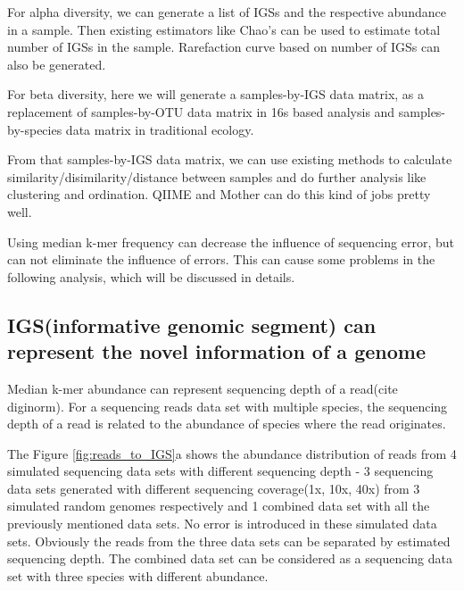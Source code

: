 \documentclass{article}
\begin{document}
For alpha diversity, we can generate a list of IGSs and the respective abundance in a sample. Then existing estimators like Chao's can be used to estimate total number of IGSs in the sample. Rarefaction curve based on number of IGSs can also be generated. 

For beta diversity, here we will generate a samples-by-IGS data matrix, as a replacement of samples-by-OTU data matrix in 16s based analysis and samples-by-species data matrix in traditional ecology. 


From that samples-by-IGS data matrix, we can use existing methods to calculate similarity/disimilarity/distance between samples and do further analysis like clustering and ordination. QIIME and Mother can do this kind of jobs pretty well.


Using median k-mer frequency can decrease the influence of sequencing error, but can not eliminate the influence of errors. This can cause some problems in the following analysis, which will be discussed in details.





\subsection{IGS(informative genomic segment) can represent the novel information of a genome}

Median k-mer abundance can represent sequencing depth of a read(cite diginorm). For a sequencing reads data set with multiple species, the sequencing depth of a read is related to the abundance of species where the read originates. 

The Figure \ref{fig:reads_to_IGS}a  shows the abundance distribution of reads from 4 simulated sequencing data sets with different sequencing depth - 3 sequencing data sets generated with different sequencing coverage(1x, 10x, 40x) from 3 simulated random genomes respectively and 1 combined data set with all the previously mentioned data sets. No error is introduced in these simulated data sets. Obviously the reads from the three data sets can be separated by estimated sequencing depth. The combined data set can be considered as a sequencing data set with three species with different abundance.
\end{document}
